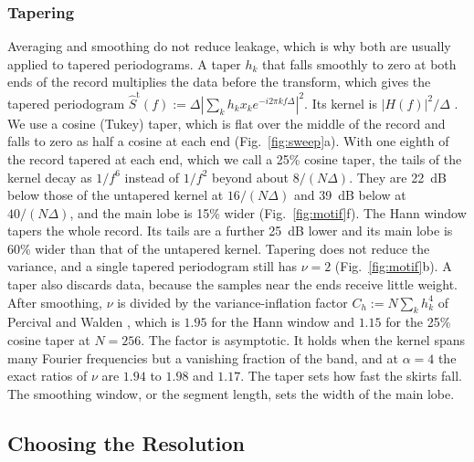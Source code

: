 \documentclass[10pt,twocolumn]{article}
\begin{document}
\subsubsection{Tapering}
\label{sec:tapering}
Averaging and smoothing do not reduce leakage, which is why both are usually applied to tapered periodograms. A taper $h_k$ that falls smoothly to zero at both ends of the record multiplies the data before the transform, which gives the tapered periodogram $\hat S^{\mathrm t}(f):=\Delta|\sum_kh_kx_ke^{-i2\pi kf\Delta}|^2$. Its kernel is $|H(f)|^2/\Delta$ \cite[eq.~(14)]{babadi2014}. We use a cosine (Tukey) taper, which is flat over the middle of the record and falls to zero as half a cosine at each end (Fig.~\ref{fig:sweep}a). With one eighth of the record tapered at each end, which we call a 25\% cosine taper, the tails of the kernel decay as $1/f^6$ instead of $1/f^2$ beyond about $8/(N\Delta)$. They are 22~dB below those of the untapered kernel at $16/(N\Delta)$ and 39~dB below at $40/(N\Delta)$, and the main lobe is 15\% wider (Fig.~\ref{fig:motif}f). The Hann window tapers the whole record. Its tails are a further 25~dB lower and its main lobe is 60\% wider than that of the untapered kernel. Tapering does not reduce the variance, and a single tapered periodogram still has $\nu=2$ (Fig.~\ref{fig:motif}b). A taper also discards data, because the samples near the ends receive little weight. After smoothing, $\nu$ is divided by the variance-inflation factor $C_h:=N\sum_kh_k^4$ of Percival and Walden \cite[eq.~(248a)]{percival1993}, which is $1.95$ for the Hann window and $1.15$ for the 25\% cosine taper at $N=256$. The factor is asymptotic. It holds when the kernel spans many Fourier frequencies but a vanishing fraction of the band, and at $\alpha=4$ the exact ratios of $\nu$ are $1.94$ to $1.98$ and $1.17$. The taper sets how fast the skirts fall. The smoothing window, or the segment length, sets the width of the main lobe.

\subsection{Choosing the Resolution}
\label{sec:resolution}
\end{document}
